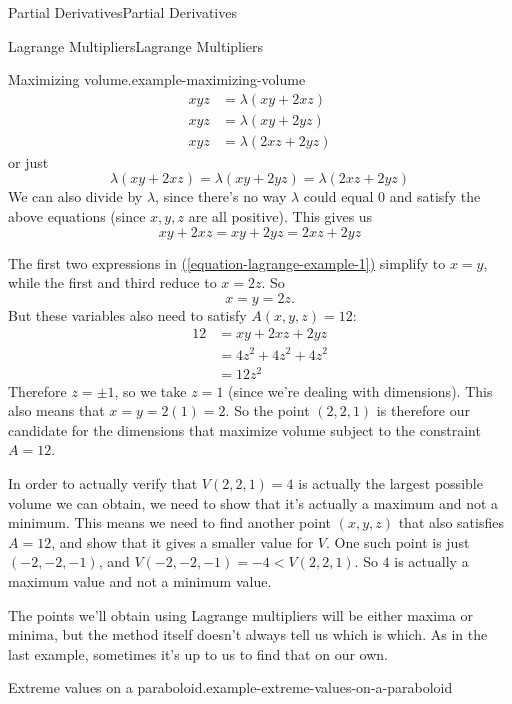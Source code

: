 \documentclass[10pt,]{book}
\numberwithin{equation}{section}
\begin{document}
\begin{chapterptx}{Partial Derivatives}{}{Partial Derivatives}{}{}
\begin{sectionptx}{Lagrange Multipliers}{}{Lagrange Multipliers}{}{}
\begin{example}{Maximizing volume.}{example-maximizing-volume}
\begin{align*}
xyz & = \lambda(xy + 2xz) \\
xyz & = \lambda(xy + 2yz) \\
xyz & = \lambda(2xz + 2yz) 
\end{align*}
or just%
\begin{equation*}
\lambda(xy + 2xz) = \lambda(xy + 2yz) = \lambda(2xz + 2yz)
\end{equation*}
We can also divide by \(\lambda\), since there's no way \(\lambda\) could equal \(0\) and satisfy the above equations (since \(x,y,z\) are all positive). This gives us%
\begin{equation}
xy + 2xz = xy + 2yz = 2xz + 2yz\label{equation-lagrange-example-1}
\end{equation}
%
\par
\hypertarget{p-1228}{}%
The first two expressions in \hyperref[equation-lagrange-example-1]{(\ref{equation-lagrange-example-1})} simplify to \(x=y\), while the first and third reduce to \(x = 2z\). So%
\begin{equation*}
x = y = 2z\text{.}
\end{equation*}
But these variables also need to satisfy \(A(x,y,z) = 12\):%
\begin{align*}
12 & = xy + 2xz + 2yz \\
& = 4z^{2} + 4z^{2} + 4z^{2} \\
& = 12z^{2} 
\end{align*}
Therefore \(z = \pm1\), so we take \(z=1\) (since we're dealing with dimensions). This also means that \(x = y = 2(1) = 2\). So the point \((2,2,1)\) is therefore our candidate for the dimensions that maximize volume subject to the constraint \(A = 12\).%
\par
\hypertarget{p-1229}{}%
In order to actually verify that \(V(2,2,1) = 4\) is actually the largest possible volume we can obtain, we need to show that it's actually a maximum and not a minimum. This means we need to find another point \((x,y,z)\) that also satisfies \(A = 12\), and show that it gives a smaller value for \(V\). One such point is just \((-2,-2,-1)\), and \(V(-2,-2,-1) = -4 < V(2,2,1)\). So \(4\) is actually a maximum value and not a minimum value.%
\end{example}
\hypertarget{p-1230}{}%
The points we'll obtain using Lagrange multipliers will be either maxima or minima, but the method itself doesn't always tell us which is which. As in the last example, sometimes it's up to us to find that on our own.%
\begin{example}{Extreme values on a paraboloid.}{example-extreme-values-on-a-paraboloid}%

\end{example}
\end{sectionptx}
\end{chapterptx}
\end{document}
